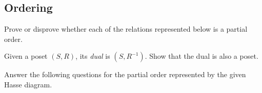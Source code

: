 \documentclass[addpoints]{exam}
\begin{document}
\begin{questions}
  \section{Ordering}
  
\question Prove or disprove whether each of the relations represented below is a partial order.
  \begin{multicols}{3}
  \end{multicols}
  \begin{solution}
    \begin{parts}
    \part 
    \part 
    \end{parts}
  \end{solution}
  
\question[5] Given a poset $(S, R)$, its \textit{dual} is $(S,R^{-1})$. Show that the dual is also a poset. 
  \begin{solution}
  \end{solution}
  
\question Answer the following questions for the partial order represented by the given Hasse diagram.
  
  \begin{minipage}{.3\textwidth}
\end{minipage}
\end{questions}
\end{document}
